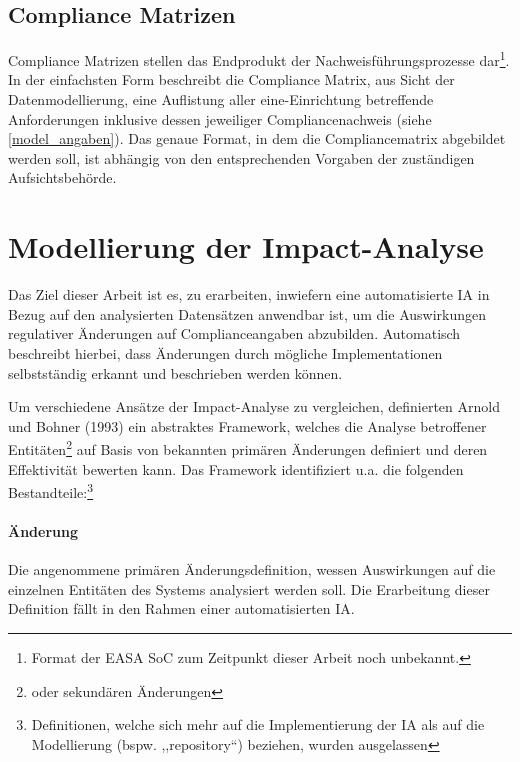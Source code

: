 \subsection{Compliance Matrizen}

    Compliance Matrizen stellen das Endprodukt der Nachweisführungsprozesse dar\footnote{Format der \ac{EASA} \ac{SoC} zum Zeitpunkt dieser Arbeit noch unbekannt.}.
    In der einfachsten Form beschreibt die Compliance Matrix, aus Sicht der Datenmodellierung, eine Auflistung aller eine\atmans-Einrichtung betreffende Anforderungen inklusive dessen jeweiliger Compliancenachweis (siehe \ref{model_angaben}).
    Das genaue Format, in dem die Compliancematrix abgebildet werden soll, ist abhängig von den entsprechenden Vorgaben der zuständigen Aufsichtsbehörde.


\pagebreak
\section{Modellierung der Impact-Analyse}
\label{model_ia}
    
    Das Ziel dieser Arbeit ist es, zu erarbeiten, inwiefern eine automatisierte \acf{IA} in Bezug auf den analysierten Datensätzen anwendbar ist, um die Auswirkungen regulativer Änderungen auf Complianceangaben abzubilden.
    Automatisch beschreibt hierbei, dass Änderungen durch mögliche Implementationen selbstständig erkannt und beschrieben werden können.
    
    \medskip
    Um verschiedene Ansätze der Impact-Analyse zu vergleichen, definierten Arnold und Bohner (1993) \cite{app_bohner} ein abstraktes Framework, welches die Analyse betroffener Entitäten\footnote{oder sekundären Änderungen} auf Basis von bekannten primären Änderungen definiert und deren Effektivität bewerten kann.
    \cite[22]{app_lindvall}
    Das Framework identifiziert u.a. die folgenden Bestandteile:\footnote{Definitionen, welche sich mehr auf die Implementierung der \ac{IA} als auf die Modellierung (bspw. ,,repository``) beziehen, wurden ausgelassen}
    
    \paragraph{Änderung}
        Die angenommene primären Änderungsdefinition,\hspace{1pt} wessen Auswirkungen auf die einzelnen Entitäten des Systems analysiert werden soll.
        Die Erarbeitung dieser Definition fällt in den Rahmen einer automatisierten \ac{IA}. 
    
